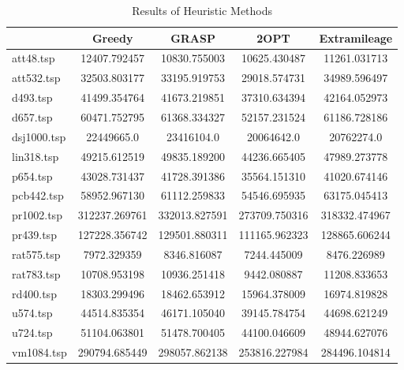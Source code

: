 \begin{table}[]
    \centering
    \begin{tabular}{lcccc}
    \cline{2-5}
                & \textbf{Greedy} & \textbf{GRASP}  & \textbf{2OPT}   & \textbf{Extramileage} \\ \hline
    att48.tsp   & 12407.792457    & 10830.755003    & 10625.430487    & 11261.031713          \\
    att532.tsp  & 32503.803177    & 33195.919753    & 29018.574731    & 34989.596497          \\
    d493.tsp    & 41499.354764    & 41673.219851    & 37310.634394    & 42164.052973          \\
    d657.tsp    & 60471.752795    & 61368.334327    & 52157.231524    & 61186.728186          \\
    dsj1000.tsp & 22449665.0 & 23416104.0 & 20064642.0 & 20762274.0       \\
    lin318.tsp  & 49215.612519    & 49835.189200    & 44236.665405    & 47989.273778          \\
    p654.tsp    & 43028.731437    & 41728.391386    & 35564.151310    & 41020.674146          \\
    pcb442.tsp  & 58952.967130    & 61112.259833    & 54546.695935    & 63175.045413          \\
    pr1002.tsp  & 312237.269761   & 332013.827591   & 273709.750316   & 318332.474967         \\
    pr439.tsp   & 127228.356742   & 129501.880311   & 111165.962323   & 128865.606244         \\
    rat575.tsp  & 7972.329359     & 8346.816087     & 7244.445009     & 8476.226989           \\
    rat783.tsp  & 10708.953198    & 10936.251418    & 9442.080887     & 11208.833653          \\
    rd400.tsp   & 18303.299496    & 18462.653912    & 15964.378009    & 16974.819828          \\
    u574.tsp    & 44514.835354    & 46171.105040    & 39145.784754    & 44698.621249          \\
    u724.tsp    & 51104.063801    & 51478.700405    & 44100.046609    & 48944.627076          \\
    vm1084.tsp  & 290794.685449   & 298057.862138   & 253816.227984   & 284496.104814         \\ \hline
    \end{tabular}
    \caption{Results of Heuristic Methods}
    \label{table:heuristics}
\end{table}



